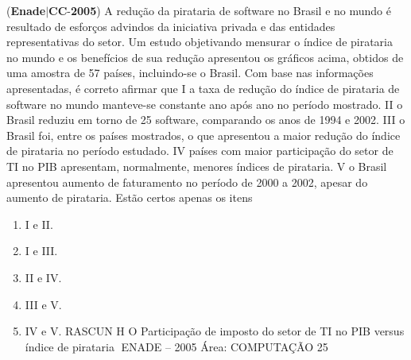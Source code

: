 \documentclass{exam}
\begin{document}
\begin{questions}
\question (\textbf{Enade}$|$\textbf{CC}-\textbf{2005}) A redução da pirataria de software no Brasil e no mundo
é resultado de esforços advindos da iniciativa privada e das
entidades representativas do setor. Um estudo objetivando
mensurar o índice de pirataria no mundo e os benefícios de sua
redução apresentou os gráficos acima, obtidos de uma amostra
de 57 países, incluindo-se o Brasil.
Com base nas informações apresentadas, é correto afirmar que
I a taxa de redução do índice de pirataria de software no mundo
manteve-se constante ano após ano no período mostrado.
II o Brasil reduziu em torno de 25%
software, comparando os anos de 1994 e 2002.
III o Brasil foi, entre os países mostrados, o que apresentou a maior
redução do índice de pirataria no período estudado.
IV países com maior participação do setor de TI no PIB apresentam,
normalmente, menores índices de pirataria.
V o Brasil apresentou aumento de faturamento no período de 2000
a 2002, apesar do aumento de pirataria.
Estão certos apenas os itens
	\begin{enumerate}[label=\alph*)]
		\item  I e II. 
		\item  I e III. 
		\item  II e IV.
		\item  III e V.
		\item  IV e V.
RASCUN H O
Participação de imposto do setor de TI no PIB
versus índice de pirataria
ENADE – 2005 Área: COMPUTAÇÃO 25

	\end{enumerate}


\end{questions}
\end{document}
